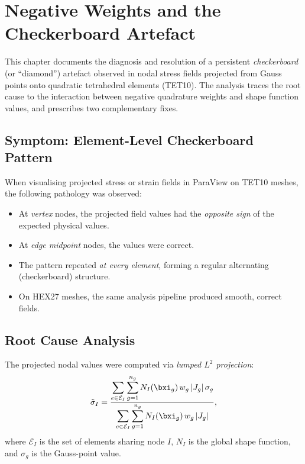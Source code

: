 
\chapter{Negative Weights and the Checkerboard Artefact}
\label{ch:negative_weights}

This chapter documents the diagnosis and resolution of a persistent
\emph{checkerboard} (or ``diamond'') artefact observed in nodal stress fields
projected from Gauss points onto quadratic tetrahedral elements (TET10).  The
analysis traces the root cause to the interaction between negative quadrature
weights and shape function values, and prescribes two complementary fixes.


\section{Symptom: Element-Level Checkerboard Pattern}
\label{sec:symptom}

When visualising projected stress or strain fields in ParaView on TET10 meshes,
the following pathology was observed:
\begin{itemize}[nosep]
  \item At \emph{vertex} nodes, the projected field values had the
        \emph{opposite sign} of the expected physical values.
  \item At \emph{edge midpoint} nodes, the values were correct.
  \item The pattern repeated \emph{at every element}, forming a regular
        alternating (checkerboard) structure.
  \item On HEX27 meshes, the same analysis pipeline produced smooth, correct
        fields.
\end{itemize}


\section{Root Cause Analysis}
\label{sec:root_cause}

The projected nodal values were computed via \emph{lumped $L^2$ projection}:
\begin{equation}
  \tilde{\sigma}_I
  = \frac{\displaystyle\sum_{e \in \mathcal{E}_I}
          \sum_{g=1}^{n_g} N_I(\bxi_g)\, w_g\, |J_g|\, \sigma_g}
         {\displaystyle\sum_{e \in \mathcal{E}_I}
          \sum_{g=1}^{n_g} N_I(\bxi_g)\, w_g\, |J_g|},
  \label{eq:lumped_L2}
\end{equation}
where $\mathcal{E}_I$ is the set of elements sharing node $I$, $N_I$ is the
global shape function, and $\sigma_g$ is the Gauss-point value.

